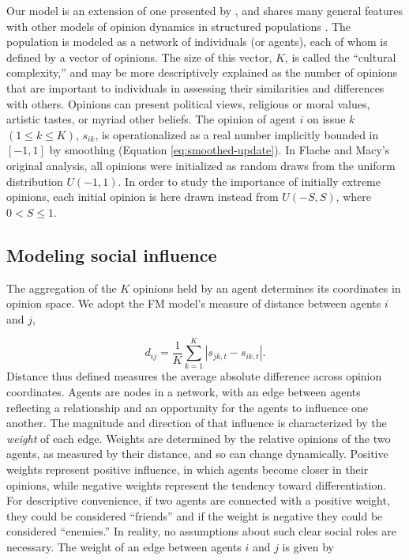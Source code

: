 Our model is an extension
of one presented by , and shares many general features with
other models of opinion dynamics in structured populations \cite{Nowak1990,carley1990group,Axelrod1997,mark1998beyond,mark2003culture,Dandekar2013,DellaPosta2015,battiston2017layered}.  The population is modeled as a network of individuals (or agents), each of whom is defined by a vector of opinions. The
size of this vector, $K$, is called the ``cultural complexity,'' 
and may be more descriptively explained as the number of  opinions that are
important to individuals in assessing their similarities and differences with
others. Opinions can present political views, religious or moral values,
artistic tastes, or myriad other beliefs. The opinion of agent $i$ on issue $k$
$(1 \leq k \leq K)$, $s_{ik}$, is operationalized as a real number implicitly bounded in
$[-1, 1]$ by smoothing (Equation \ref{eq:smoothed-update}). 
%
In Flache and Macy's original analysis, all opinions were initialized as random
draws from the uniform distribution $U(-1,1)$. In order to study the importance
of initially extreme opinions, each initial opinion is here drawn instead from
$U(-S, S)$, where $0 < S \leq 1$.   

\subsection{Modeling social influence} 

The aggregation of the $K$ opinions held by an agent 
determines its coordinates in opinion space.
We adopt the FM model's measure of distance between agents $i$ and $j$,

\begin{equation}
  d_{ij} = \frac{1}{K}\sum_{k=1}^{K} |s_{jk,t} - s_{ik,t}|.
\end{equation}
\noindent
Distance thus defined measures the average absolute difference across 
opinion coordinates.  Agents are nodes in a network, 
with an edge between agents reflecting a
relationship and an opportunity for the agents to influence one another. The
magnitude and direction of that influence is characterized by the {\em weight}
of each edge. Weights are determined by the relative opinions of the
two agents, as measured by their distance, and so can change dynamically. Positive weights represent positive
influence, in which agents become closer in their opinions, while negative
weights represent the tendency toward differentiation. For descriptive convenience, if two agents are
connected with a positive weight, they could be considered ``friends'' and if
the weight is negative they could be considered ``enemies.'' In reality, no assumptions about such clear social roles are necessary. The weight of an edge
between agents $i$ and $j$ is given by 

